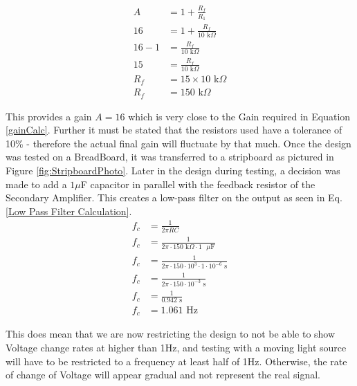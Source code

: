 \begin{equation} \label{Feedback Resistor Calculation}
  \begin{split}
  A &= 1 + \frac{R_f}{R_1} \\
  16 &= 1 + \frac{R_f}{10\text{ k}\Omega} \\
  16 - 1 &= \frac{R_f}{10\text{ k}\Omega} \\
  15 &= \frac{R_f}{10\text{ k}\Omega} \\
  R_f &= 15 \times 10\text{ k}\Omega \\
  R_f &= 150\text{ k}\Omega
  \end{split}
\end{equation}

This provides a gain $A= 16$ which is very close to the Gain required in Equation \ref{gainCalc}. Further it must be stated that the resistors used have a tolerance of 10\% - therefore the actual final gain will fluctuate by that much. Once the design was tested on a BreadBoard, it was transferred to a stripboard as pictured in Figure \ref{fig:StripboardPhoto}.
Later in the design during testing, a decision was made to add a $1\mu$F capacitor in parallel with the feedback resistor of the Secondary Amplifier. This creates a low-pass filter on the output as seen in Eq. \ref{Low Pass Filter Calculation}.
\begin{equation} \label{Low Pass Filter Calculation}
  \begin{split}
    f_c &= \frac{1}{2\pi RC} \\
    f_c &= \frac{1}{2\pi \cdot 150\text{ k}\Omega \cdot 1\text{ }\mu\text{F}} \\
    f_c &= \frac{1}{2\pi \cdot 150 \cdot 10^3 \cdot 1 \cdot 10^{-6}\text{ s}} \\
    f_c &= \frac{1}{2\pi \cdot 150 \cdot 10^{-3}\text{ s}} \\
    f_c &= \frac{1}{0.942\text{ s}} \\
    f_c &= 1.061\text{ Hz}
  \end{split}
\end{equation}

This does mean that we are now restricting the design to not be able to show Voltage change rates at higher than 1Hz, and testing with a moving light source will have to be restricted to a frequency at least half of 1Hz. Otherwise, the rate of change of Voltage will appear gradual and not represent the real signal. 


